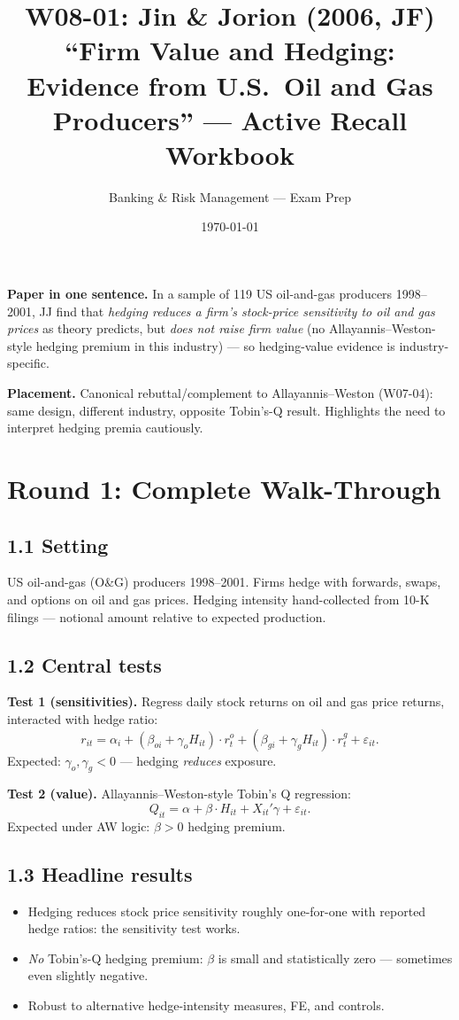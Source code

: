 \documentclass[11pt]{article}
\title{W08-01: Jin \& Jorion (2006, JF) \\
\large ``Firm Value and Hedging: Evidence from U.S.\ Oil and Gas Producers'' --- Active Recall Workbook}
\author{Banking \& Risk Management --- Exam Prep}
\date{\today}
\begin{document}
\maketitle

\begin{keybox}
\textbf{Paper in one sentence.} In a sample of 119 US oil-and-gas producers 1998--2001, JJ find that \emph{hedging reduces a firm's stock-price sensitivity to oil and gas prices} as theory predicts, but \emph{does not raise firm value} (no Allayannis--Weston-style hedging premium in this industry) --- so hedging-value evidence is industry-specific.

\textbf{Placement.} Canonical rebuttal/complement to Allayannis--Weston (W07-04): same design, different industry, opposite Tobin's-Q result. Highlights the need to interpret hedging premia cautiously.
\end{keybox}

\section*{Round 1: Complete Walk-Through}

\subsection*{1.1 Setting}
US oil-and-gas (O\&G) producers 1998--2001. Firms hedge with forwards, swaps, and options on oil and gas prices. Hedging intensity hand-collected from 10-K filings --- notional amount relative to expected production.

\subsection*{1.2 Central tests}
\textbf{Test 1 (sensitivities).} Regress daily stock returns on oil and gas price returns, interacted with hedge ratio:
\[
r_{it}=\alpha_i+(\beta_{oi}+\gamma_o H_{it})\cdot r^o_t+(\beta_{gi}+\gamma_g H_{it})\cdot r^g_t+\varepsilon_{it}.
\]
Expected: $\gamma_o,\gamma_g<0$ --- hedging \emph{reduces} exposure.

\textbf{Test 2 (value).} Allayannis--Weston-style Tobin's Q regression:
\[
Q_{it}=\alpha + \beta\cdot H_{it}+X_{it}'\gamma+\varepsilon_{it}.
\]
Expected under AW logic: $\beta>0$ hedging premium.

\subsection*{1.3 Headline results}
\begin{itemize}
\item Hedging reduces stock price sensitivity roughly one-for-one with reported hedge ratios: the sensitivity test works.
\item \emph{No} Tobin's-Q hedging premium: $\beta$ is small and statistically zero --- sometimes even slightly negative.
\item Robust to alternative hedge-intensity measures, FE, and controls.
\end{itemize}
\end{document}
